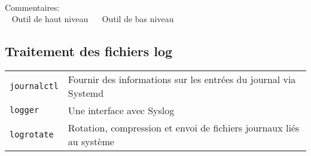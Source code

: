 \documentclass[10pt,a4paper]{article}
\begin{document}
\begin{multicols}{2}
~ \\
\noindent Commentaires: \\ ~ Outil de haut niveau ~ ~Outil de bas niveau

\end{multicols}

\newpage

\cheatsheet

\begin{multicols}{2}   

\section{Traitement des fichiers log}
\begin{tabular}{ p{2.5cm} p{8.5cm} }
  \hline
  \texttt{journalctl} & Fournir des informations sur les entrées du journal via Systemd \\
  \rowcolor{Gray}
  \texttt{logger} & Une interface avec Syslog \\
  \texttt{logrotate} & Rotation, compression et envoi de fichiers journaux liés au système \\
  \hline
\end{tabular}

~ \\
\vfill


\end{multicols}
\end{document}
